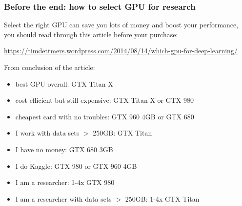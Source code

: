 \documentclass{beamer}
\begin{document}
\begin{frame}
\frametitle{Before the end: how to select GPU for research}

Select the right GPU can save you lots of money and boost your performance, you should read through this article before your purchase:

\url{https://timdettmers.wordpress.com/2014/08/14/which-gpu-for-deep-learning/}

From conclusion of the article:
\small
\begin{itemize}
\item[\ding{96}] best GPU overall: GTX Titan X
\item[\ding{96}] cost efficient but still expensive: GTX Titan X or GTX 980
\item[\ding{96}] cheapest card with no troubles: GTX 960 4GB or GTX 680
\item[\ding{96}] I work with data sets $>$ 250GB: GTX Titan
\item[\ding{96}] I have no money: GTX 680 3GB
\item[\ding{96}] I do Kaggle: GTX 980 or GTX 960 4GB
\item[\ding{96}] I am a researcher: 1-4x GTX 980
\item[\ding{96}] I am a researcher with data sets $>$ 250GB: 1-4x GTX Titan
\end{itemize}

\end{frame}
\end{document}
